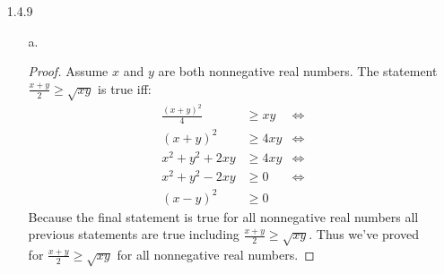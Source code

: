 \documentclass[11pt]{amsart}
\theoremstyle{definition}
\begin{document}
\begin{itemize}
\begin{itemize}
\begin{proof}
        \paragraph{Case 1:}
            If $n$ is odd, so that $n=2k+1$ for some $k\in\mathbb{Z}$ greater than or equal to $0$, then $n^2+n+3=(2k+1)^2+2k+1+3=4k^2+4k+1+2k+4=4k^2+6k+4+1=2(2k^2+3k+2)+1=2j+1$ where $j=2k^2+3k+2$ is an integer greater than or equal to $2$.
        \paragraph{Case 2:}
            If $n$ is even, so that $n=2k$ for some $k\in\mathbb{Z}$ greater than or equal to $1$, then $n^2+n+3=(2k)^2+2k+3=4k^2+2k+2+1=2(2k^2+k+1)+1=2j+1$ where $j=2k^2+k+1$ is an integer greater than or equal to $3$. \\
        Thus we've proved that $n^2+n+3$ is odd if $n\in\mathbb{N}$ by showing all cases are true.
    \end{proof}
    
    \item[b.] \begin{proof}
        Assume $n$ is a natural number. We'll prove $n^2+n+3$ is odd. Since $n^2+n+3=n(n+1)+3$ and $a(a+1)$ is even for any $a\in\mathbb{Z}$ then $n(n+1)$ is even. Since $x+y$ is odd when $x$ is even and $y$ is odd, and $n(n+1)$ is even and $3$ is odd (since $3=2(1)+1$), then $n^2+n+3$ is odd. Thus we've proved $n^2+n+3$ is odd for any integer $n$ and natural numbers are within the domain of integers so it is true for all natural numbers $n$ as well.
    \end{proof}

\end{itemize}

\item[1.4.9]
\begin{itemize}
    \item[a.] \begin{proof}
        Assume $x$ and $y$ are both nonnegative real numbers. The statement $\frac{x+y}2\ge \sqrt{xy}$ is true iff:
        \begin{align*}
            \frac{(x+y)^2}{4}&\ge xy &\iff \\
            (x+y)^2&\ge 4xy &\iff \\
            x^2+y^2+2xy&\ge 4xy &\iff \\
            x^2+y^2-2xy&\ge 0 &\iff \\
            (x-y)^2&\ge 0
        \end{align*}
        Because the final statement is true for all nonnegative real numbers all previous statements are true including $\frac{x+y}2\ge \sqrt{xy}$. Thus we've proved for $\frac{x+y}2\ge \sqrt{xy}$ for all nonnegative real numbers.
    \end{proof}
    

\end{itemize}
\end{itemize}
\end{document}
